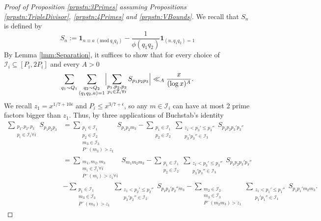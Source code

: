 \documentclass[10pt]{amsart}
\theoremstyle{plain}
\numberwithin{equation}{section}
\newcommand{\Mod}[1]{\ (\mathrm{mod}\ #1)}
\begin{document}
\begin{proof}[Proof of Proposition \ref{prpstn:3Primes} assuming Propositions \ref{prpstn:TripleDivisor}, \ref{prpstn:4Primes} and \ref{prpstn:VBounds}] 
We recall that $S_n$ is defined by
\[
S_n:=\mathbf{1}_{n\equiv a\Mod{q_1q_2}}-\frac{1}{\phi(q_1q_2)}\mathbf{1}_{(n,q_1q_2)=1}
\]
By Lemma \ref{lmm:Separation}, it suffices to show that for every choice of $\mathcal{I}_i\subseteq[P_i,2P_i]$ and every $A>0$
\[
\sum_{q_1\sim Q_1}\sum_{\substack{ q_2\sim Q_2\\ (q_1q_2,a)=1}}\Bigl|\sum_{\substack{p_1,p_2,p_3\\ p_i\in \mathcal{I}_i\forall i}}S_{p_1p_2p_3}\Bigr|\ll_A \frac{x}{(\log{x})^A}.
\]
We recall $z_1=x^{1/7+10\epsilon}$ and $P_i\le x^{3/7+\epsilon}$, so any $m\in \mathcal{I}_i$ can have at most 2 prime factors bigger than $z_1$. Thus, by three applications of Buchstab's identity
\begin{align*}
\sum_{\substack{p_1,p_2,p_3\\ p_i\in \mathcal{I}_i\forall i}}S_{p_1p_2p_3}&=\sum_{\substack{p_1\in \mathcal{I}_1\\ p_2\in \mathcal{I}_2\\ m_3\in \mathcal{I}_3\\ P^-(m_3)>z_1}}S_{p_1 p_2 m_3}-\sum_{\substack{p_1\in\mathcal{I}_1\\ p_2\in \mathcal{I}_2}}\sum_{\substack{z_1<p_3'\le p_3''\\ p_3'p_3''\in\mathcal{I}_3}}S_{p_1p_2p_3'p_3''}\\
&=\sum_{\substack{m_1,m_2,m_3\\ m_i\in \mathcal{I}_i\forall i\\ P^-(m_i)>z_1\forall i}}S_{m_1 m_2 m_3}-\sum_{\substack{p_1\in\mathcal{I}_1\\ p_2\in \mathcal{I}_2}}\sum_{\substack{z_1<p_3'\le p_3''\\ p_3'p_3''\in\mathcal{I}_3}}S_{p_1p_2p_3'p_3''}\\
&-\sum_{\substack{p_1\in\mathcal{I}_1\\ m_3\in \mathcal{I}_3\\ P^-(m_3)>z_1 }}\sum_{\substack{z_1<p_2'\le p_2''\\ p_2'p_2''\in\mathcal{I}_2}}S_{p_1p_2'p_2''m_3}-\sum_{\substack{m_2\in\mathcal{I}_2\\ m_3\in \mathcal{I}_3\\ P^-(m_2 m_3)>z_1 }}\sum_{\substack{z_1<p_1'\le p_1''\\ p_1'p_1''\in\mathcal{I}_1}}S_{p_1p_1' m_2 m_3}.
\end{align*}

\end{proof}
\end{document}
